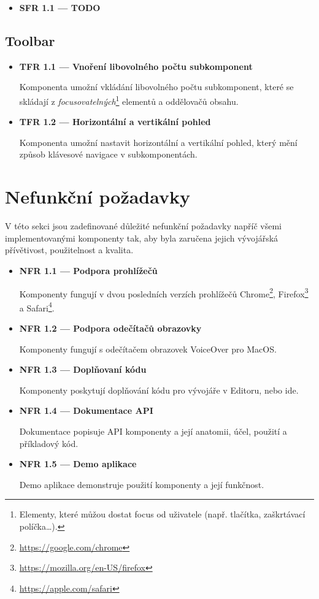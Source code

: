 \begin{itemize}
      \item \textbf{SFR 1.1 --- TODO}
\end{itemize}

\subsection{Toolbar}

\begin{itemize}
      \item \textbf{TFR 1.1 --- Vnoření libovolného počtu subkomponent}\label{tfr11}

            Komponenta umožní vkládání libovolného počtu subkomponent, které se skládají z \textit{focusovatelných}\footnote{Elementy, které můžou dostat focus od uživatele (např. tlačítka, zaškrtávací políčka\dots).} elementů a oddělovačů obsahu.

      \item \textbf{TFR 1.2 --- Horizontální a vertikální pohled}\label{tfr12}

            Komponenta umožní nastavit horizontální a vertikální pohled, který mění způsob klávesové navigace v subkomponentách.
\end{itemize}

\section{Nefunkční požadavky}

V této sekci jsou zadefinované důležité nefunkční požadavky napříč všemi implementovanými komponenty tak, aby byla zaručena jejich vývojářská přívětivost, použitelnost a kvalita.

\begin{itemize}
      \item \textbf{NFR 1.1 --- Podpora prohlížečů}\label{nfr11}

            Komponenty fungují v dvou posledních verzích prohlížečů Chrome\footnote{\url{https://google.com/chrome}}, Firefox\footnote{\url{https://mozilla.org/en-US/firefox}} a Safari\footnote{\url{https://apple.com/safari}}.

      \item \textbf{NFR 1.2 --- Podpora odečítačů obrazovky}\label{nfr12}

            Komponenty fungují s odečítačem obrazovek VoiceOver pro MacOS.

      \item \textbf{NFR 1.3 --- Doplňovaní kódu}

            Komponenty poskytují doplňování kódu pro vývojáře v Editoru, nebo \gls{ide}.

      \item \textbf{NFR 1.4 --- Dokumentace API}\label{nfr14}

            Dokumentace popisuje API komponenty a její anatomii, účel, použití a příkladový kód.

      \item \textbf{NFR 1.5 --- Demo aplikace}\label{nfr15}

            Demo aplikace demonstruje použití komponenty a její funkčnost.
\end{itemize}


